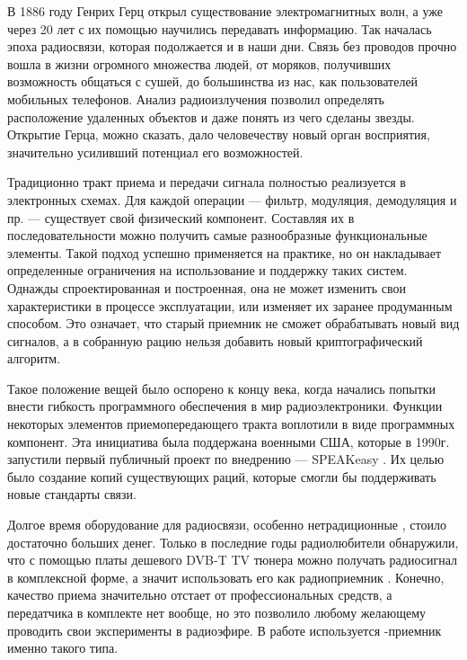 \label{sec:intro}

В 1886 году Генрих Герц открыл существование электромагнитных волн, а уже через 20 лет с их помощью научились передавать информацию. Так началась эпоха радиосвязи, которая подолжается и в наши дни. Связь без проводов прочно вошла в жизни огромного множества людей, от моряков, получивших возможность общаться с сушей, до большинства из нас, как пользователей мобильных телефонов. Анализ радиоизлучения позволил определять расположение удаленных объектов и даже понять из чего сделаны звезды. Открытие Герца, можно сказать, дало человечеству новый орган восприятия, значительно усиливший потенциал его возможностей.

Традиционно тракт приема и передачи сигнала полностью реализуется в электронных схемах. Для каждой операции --- фильтр, модуляция, демодуляция и пр. --- существует свой физический компонент. Составляя их в последовательности можно получить самые разнообразные функциональные элементы. Такой подход успешно применяется на практике, но он накладывает определенные ограничения на использование и поддержку таких систем. Однажды спроектированная и построенная, она не может изменить свои характеристики в процессе эксплуатации, или изменяет их заранее продуманным способом. Это означает, что старый приемник не сможет обрабатывать новый вид сигналов, а в собранную рацию нельзя добавить новый криптографический алгоритм.

Такое положение вещей было оспорено к концу  века, когда начались попытки внести гибкость программного обеспечения в мир радиоэлектроники. Функции некоторых элементов приемопередающего тракта воплотили в виде программных компонент. Эта инициатива была поддержана военными США, которые в 1990г. запустили первый публичный проект по внедрению \SDR --- SPEAKeasy \cite{speakeasy_wiki}. Их целью было создание копий существующих раций, которые смогли бы поддерживать новые стандарты связи.

Долгое время оборудование для радиосвязи, особенно нетрадиционные \SDR, стоило достаточно больших денег. Только в последние годы радиолюбители обнаружили, что с помощью платы дешевого DVB-T TV тюнера можно получать радиосигнал в комплексной форме, а значит использовать его как радиоприемник \cite{rtl_sdr_about}. Конечно, качество приема значительно отстает от профессиональных средств, а передатчика в комплекте нет вообще, но это позволило любому желающему проводить свои эксперименты в радиоэфире. В работе используется \SDR-приемник именно такого типа.

